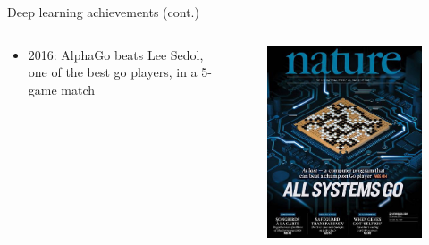 \documentclass[xcolor=pdftex,dvipsnames,table,mathserif]{beamer}
\begin{document}
\begin{frame}{Deep learning achievements (cont.)}

  \begin{columns}
    \begin{column}{.4\textwidth}
      \begin{itemize}
      \item 2016: AlphaGo beats Lee Sedol, one of the best go players, in a 5-game match
      \end{itemize}
    \end{column}

    \begin{column}{.6\textwidth}

      \begin{figure}[ht]
        \centering
        \includegraphics[width=\textwidth]{nature_go.jpg}
      \end{figure}
    \end{column}
  \end{columns}




\end{frame}
\end{document}
